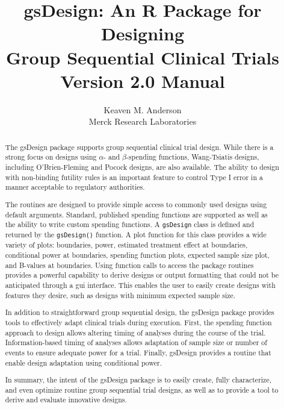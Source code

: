 \title{gsDesign: An R Package for Designing \\Group Sequential Clinical Trials\\Version 2.0 Manual}
\author{Keaven M. Anderson\\Merck Research Laboratories}
\maketitle

\begin{abstract}
The gsDesign package supports group sequential clinical trial design. While
there is a strong focus on designs using $\alpha$- and $\beta$-spending
functions, Wang-Tsiatis designs, including O'Brien-Fleming and Pocock designs,
are also available. The ability to design with non-binding futility rules is
an important feature to control Type I error in a manner acceptable to
regulatory authorities.

The routines are designed to provide simple access to commonly used designs
using default arguments. Standard, published spending functions are supported
as well as the ability to write custom spending functions. A \texttt{gsDesign}
class is defined and returned by the \texttt{gsDesign()} function. A plot
function for this class provides a wide variety of plots: boundaries, power,
estimated treatment effect at boundaries, conditional power at boundaries,
spending function plots, expected sample size plot, and B-values at
boundaries. Using function calls to access the package routines provides a
powerful capability to derive designs or output formatting that could not be
anticipated through a gui interface. This enables the user to easily create
designs with features they desire, such as designs with minimum expected
sample size.

In addition to straightforward group sequential design, the gsDesign package provides tools to effectively adapt clinical trials during execution. 
First, the spending function approach to design allows altering timing of analyses during the course of the trial. 
Information-based timing of analyses allows adaptation of sample size or number of events to ensure adequate power for a trial.
Finally, gsDesign provides a routine that enable design adaptation using conditional power.

In summary, the intent of the gsDesign package is to easily create, fully
characterize, and even optimize routine group sequential trial designs, as well
as to provide a tool to derive and evaluate innovative designs.

\end{abstract}

